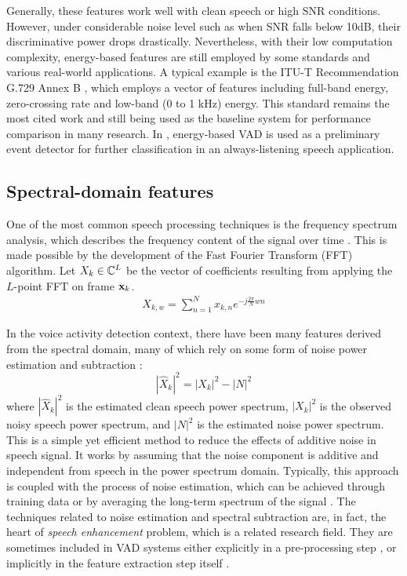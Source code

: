 Generally, these features work well with clean speech or high SNR conditions.
However, under considerable noise level such as when SNR falls below 10dB, their discriminative power drops drastically.
Nevertheless, with their low computation complexity, energy-based features are still employed by some standards and various real-world applications.
A typical example is the ITU-T Recommendation G.729 Annex B \cite{benyassine1997robust}, which employs a vector of features including full-band energy, zero-crossing rate and low-band (0 to 1 kHz) energy.
This standard remains the most cited work and still being used as the baseline system for performance comparison in many research.
In \cite{cho2011enhanced}, energy-based VAD is used as a preliminary event detector for further classification in an always-listening speech application.

\subsection{Spectral-domain features}
One of the most common speech processing techniques is the frequency spectrum analysis, which describes the frequency content of the signal over time \cite{rabiner1978digital}.
This is made possible by the development of the Fast Fourier Transform (FFT) algorithm.
Let $X_k \in \mathbb{C}^L$ be the vector of coefficients resulting from applying the $L$-point FFT on frame $\mathbf{x}_k$.
\begin{align}
    X_{k,w} = \sum_{n=1}^N x_{k,n}e^{-j\frac{2\pi}{N}wn}
\end{align}

In the voice activity detection context, there have been many features derived from the spectral domain, many of which rely on some form of noise power estimation and subtraction \cite{boll1979suppression}:
\begin{equation}
    |\hat{X}_k|^2 = |X_k|^2 - |N|^2
\end{equation}
where $|\hat{X}_k|^2$ is the estimated clean speech power spectrum, $|X_k|^2$ is the observed noisy speech power spectrum, and $|N|^2$ is the estimated noise power spectrum. This is a simple yet efficient method to reduce the effects of additive noise in speech signal. It works by assuming that the noise component is additive and independent from speech in the power spectrum domain. Typically, this approach is coupled with the process of noise estimation, which can be achieved through training data or by averaging the long-term spectrum of the signal \cite{ramirez2004efficient,renevey2001entropy}. The techniques related to noise estimation and spectral subtraction are, in fact, the heart of \emph{speech enhancement} problem, which is a related research field. They are sometimes included in VAD systems either explicitly in a pre-processing step \cite{ramirez2004voice}, or implicitly in the feature extraction step itself \cite{ramirez2004efficient,fukuda2010long}.

